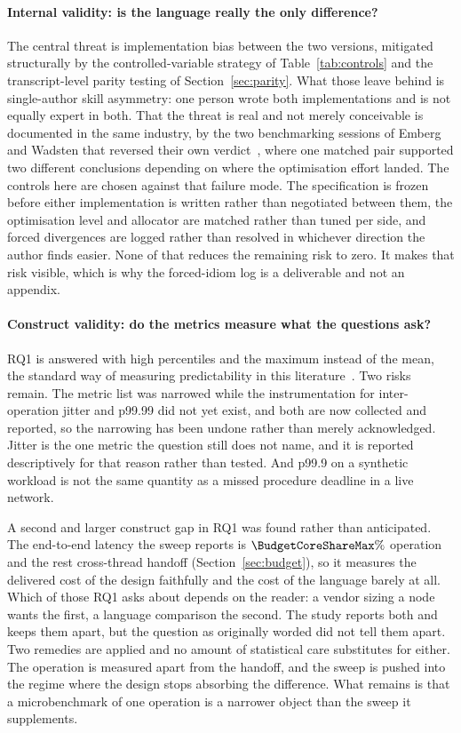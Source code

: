\paragraph{Internal validity: is the language really the only difference?}
The central threat is implementation bias between the two versions, mitigated structurally by the
controlled-variable strategy of Table~\ref{tab:controls} and the transcript-level parity testing
of Section~\ref{sec:parity}. What those leave behind is single-author skill asymmetry: one person
wrote both implementations and is not equally expert in both. That the threat is real and not
merely conceivable is documented in the same industry, by the two benchmarking sessions of Emberg
and Wadsten that reversed their own verdict~\cite{emberg2023asn1}, where one matched pair
supported two different conclusions depending on where the optimisation effort landed. The
controls here are chosen against that failure mode. The specification is frozen before either
implementation is written rather than negotiated between them, the optimisation level and
allocator are matched rather than tuned per side, and forced divergences are logged rather than
resolved in whichever direction the author finds easier. None of that reduces the remaining risk
to zero. It makes that risk visible, which is why the forced-idiom log is a deliverable and not an
appendix.

\paragraph{Construct validity: do the metrics measure what the questions ask?}
RQ1 is answered with high percentiles and the maximum instead of the mean, the standard way of
measuring predictability in this literature~\cite{dean2013tail}. Two risks remain. The metric list
was narrowed while the instrumentation for inter-operation jitter and p99.99 did not yet exist,
and both are now collected and reported, so the narrowing has been undone rather than merely
acknowledged. Jitter is the one metric the question still does not name, and it is reported
descriptively for that reason rather than tested. And p99.9 on a synthetic workload is not the
same quantity as a missed procedure deadline in a live network.

A second and larger construct gap in RQ1 was found rather than anticipated. The end-to-end latency
the sweep reports is $\BudgetCoreShareMax\%$ operation and the rest cross-thread handoff
(Section~\ref{sec:budget}), so it measures the delivered cost of the design faithfully and the
cost of the language barely at all. Which of those RQ1 asks about depends on the reader: a vendor
sizing a node wants the first, a language comparison the second. The study reports both and keeps
them apart, but the question as originally worded did not tell them apart. Two remedies are
applied and no amount of statistical care substitutes for either. The operation is measured apart
from the handoff, and the sweep is pushed into the regime where the design stops absorbing the
difference. What remains is that a microbenchmark of one operation is a narrower object than the
sweep it supplements.

